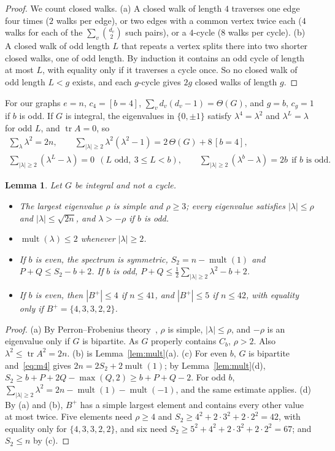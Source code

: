 \documentclass[11pt]{article}
\newtheorem{lemma}{Lemma}[section]
\theoremstyle{definition}
\theoremstyle{remark}
\DeclareMathOperator{\mult}{mult}
\DeclareMathOperator{\tr}{tr}
\begin{document}
\begin{proof}
We count closed walks. (a) A closed walk of length $4$ traverses one edge four
times ($2$ walks per edge), or two edges with a common vertex twice each ($4$
walks for each of the $\sum_v\binom{d_v}2$ such pairs), or a $4$-cycle ($8$ walks
per cycle). (b) A closed walk of odd length $L$ that repeats a vertex splits
there into two shorter closed walks, one of odd length. By induction it
contains an odd cycle of length at most $L$, with equality only if it
traverses a cycle once. So no closed walk of odd length $L<g$ exists, and each
$g$-cycle gives $2g$ closed walks of length $g$.
\end{proof}

For our graphs $e=n$, $c_4=[b=4]$, $\sum_vd_v(d_v-1)=\Theta(G)$, and $g=b$,
$c_g=1$ if $b$ is odd. If $G$ is integral, the eigenvalues in $\{0,\pm1\}$
satisfy $\lambda^4=\lambda^2$ and $\lambda^L=\lambda$ for odd $L$, and
$\tr A=0$, so
\begin{gather}
 \textstyle\sum_\lambda\lambda^2=2n,\qquad
 \sum_{|\lambda|\ge2}\lambda^2(\lambda^2-1)=2\,\Theta(G)+8\,[b=4],\label{eq:m4}\\
 \textstyle\sum_{|\lambda|\ge2}(\lambda^L-\lambda)=0\ \ (L\text{ odd},\ 3\le L<b),
 \qquad\sum_{|\lambda|\ge2}(\lambda^b-\lambda)=2b\ \ \text{if $b$ is odd}.\label{eq:odd}
\end{gather}

\begin{lemma}\label{lem:adm}
Let $G$ be integral and not a cycle.
\begin{itemize}
\item[(a)] The largest eigenvalue $\rho$ is simple and $\rho\ge3$; every
 eigenvalue satisfies $|\lambda|\le\rho$ and $|\lambda|\le\sqrt{2n}$, and
 $\lambda>-\rho$ if $b$ is odd.
\item[(b)] $\mult(\lambda)\le2$ whenever $|\lambda|\ge2$.
\item[(c)] If $b$ is even, the spectrum is symmetric, $S_2=n-\mult(1)$ and
 $P+Q\le S_2-b+2$. If $b$ is odd, $P+Q\le\frac12\sum_{|\lambda|\ge2}\lambda^2-b+2$.
\item[(d)] If $b$ is even, then $|B^+|\le4$ if $n\le41$, and $|B^+|\le5$ if
 $n\le42$, with equality only if $B^+=\{4,3,3,2,2\}$.
\end{itemize}
\end{lemma}

\begin{proof}
(a) By Perron--Frobenius theory~\cite{bh}, $\rho$ is simple, $|\lambda|\le\rho$,
and $-\rho$ is an eigenvalue only if $G$ is bipartite. As $G$ properly contains
$C_b$, $\rho>2$. Also $\lambda^2\le\tr A^2=2n$. (b) is
Lemma~\ref{lem:mult}(a). (c) For even $b$, $G$ is bipartite and~\eqref{eq:m4}
gives $2n=2S_2+2\mult(1)$; by Lemma~\ref{lem:mult}(d),
$S_2\ge b+P+2Q-\max(Q,2)\ge b+P+Q-2$. For odd $b$,
$\sum_{|\lambda|\ge2}\lambda^2=2n-\mult(1)-\mult(-1)$, and the same estimate
applies. (d) By (a) and (b), $B^+$ has a simple largest element and contains
every other value at most twice. Five elements need $\rho\ge4$ and
$S_2\ge4^2+2\cdot3^2+2\cdot2^2=42$, with equality only for $\{4,3,3,2,2\}$, and
six need $S_2\ge5^2+4^2+2\cdot3^2+2\cdot2^2=67$; and $S_2\le n$ by (c).
\end{proof}
\end{document}
